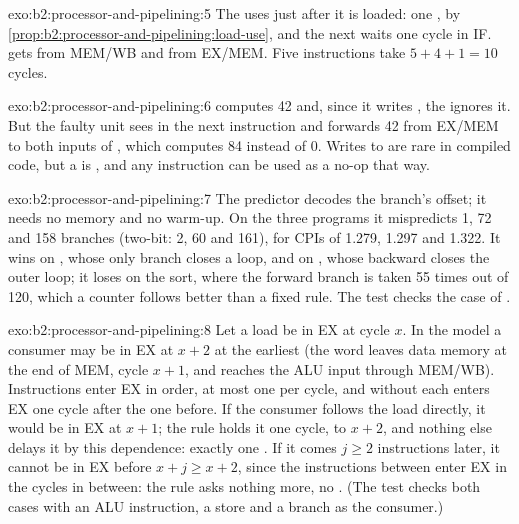 \begin{solution}{exo:b2:processor-and-pipelining:5}
The  uses  just after it is loaded: one , by
\cref{prop:b2:processor-and-pipelining:load-use}, and the next  waits one cycle in IF. 
gets  from MEM/WB and  from EX/MEM. Five instructions take $5 + 4 + 1 = 10$ cycles.
\end{solution}

\begin{solution}{exo:b2:processor-and-pipelining:6}
 computes 42 and, since it writes , the  ignores it. But the faulty unit
sees  in the next instruction and forwards 42 from EX/MEM to both inputs of , which computes 84 instead of 0. Writes to  are rare in compiled code, but a  is
, and any instruction can be used as a no-op that way.
\end{solution}

\begin{solution}{exo:b2:processor-and-pipelining:7}
The predictor decodes the branch's offset; it needs no memory and no warm-up. On the three programs it mispredicts 1,
72 and 158 branches (two-bit: 2, 60 and 161), for CPIs of 1.279, 1.297 and 1.322. It wins on , whose
only branch closes a loop, and on , whose backward  closes the outer loop; it loses on the
sort, where the forward branch  is taken 55 times out of 120, which a counter
follows better than a fixed rule. The test checks the case of .
\end{solution}

\begin{solution}{exo:b2:processor-and-pipelining:8}
Let a load be in EX at cycle $x$. In the model a consumer may be in EX at $x + 2$ at the earliest (the word leaves
data memory at the end of MEM, cycle $x + 1$, and reaches the ALU input through MEM/WB). Instructions enter EX in
order, at most one per cycle, and without  each enters EX one cycle after the one before. If the consumer
follows the load directly, it would be in EX at $x + 1$; the rule holds it one cycle, to $x + 2$, and nothing else
delays it by this dependence: exactly one . If it comes $j \ge 2$ instructions later, it cannot be in EX before
$x + j \ge x + 2$, since the instructions between enter EX in the cycles in between: the rule asks nothing more, no
. (The test checks both cases with an ALU instruction, a store and a branch as the consumer.)
\end{solution}

